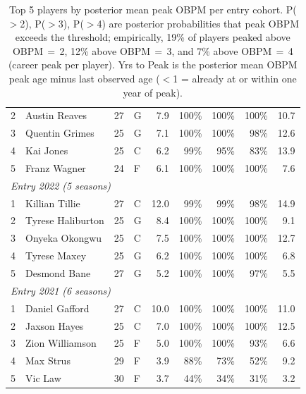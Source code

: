 \begin{table}[htbp]
\begin{tabular}{rlrlrrrrr}
    2 & Austin Reaves & 27 & G & 7.9 & 100\% & 100\% & 100\% & 10.7 \\
    3 & Quentin Grimes & 25 & G & 7.1 & 100\% & 100\% & 98\% & 12.6 \\
    4 & Kai Jones & 25 & C & 6.2 & 99\% & 95\% & 83\% & 13.9 \\
    5 & Franz Wagner & 24 & F & 6.1 & 100\% & 100\% & 100\% & 7.6 \\
    \midrule[0.4pt]
    \multicolumn{9}{l}{\textit{Entry 2022 (5 seasons)}} \\
    \midrule
    1 & Killian Tillie & 27 & C & 12.0 & 99\% & 99\% & 98\% & 14.9 \\
    2 & Tyrese Haliburton & 25 & G & 8.4 & 100\% & 100\% & 100\% & 9.1 \\
    3 & Onyeka Okongwu & 25 & C & 7.5 & 100\% & 100\% & 100\% & 12.7 \\
    4 & Tyrese Maxey & 25 & G & 6.2 & 100\% & 100\% & 100\% & 6.8 \\
    5 & Desmond Bane & 27 & G & 5.2 & 100\% & 100\% & 97\% & 5.5 \\
    \midrule[0.4pt]
    \multicolumn{9}{l}{\textit{Entry 2021 (6 seasons)}} \\
    \midrule
    1 & Daniel Gafford & 27 & C & 10.0 & 100\% & 100\% & 100\% & 11.0 \\
    2 & Jaxson Hayes & 25 & C & 7.0 & 100\% & 100\% & 100\% & 12.5 \\
    3 & Zion Williamson & 25 & F & 5.0 & 100\% & 100\% & 93\% & 6.6 \\
    4 & Max Strus & 29 & F & 3.9 & 88\% & 73\% & 52\% & 9.2 \\
    5 & Vic Law & 30 & F & 3.7 & 44\% & 34\% & 31\% & 3.2 \\
    \bottomrule
  \end{tabular}
  \caption{Top 5 players by posterior mean peak OBPM per entry cohort. P($>$2), P($>$3), P($>$4) are posterior probabilities that peak OBPM exceeds the threshold; empirically, 19\% of players peaked above OBPM\,$=$\,2, 12\% above OBPM\,$=$\,3, and 7\% above OBPM\,$=$\,4 (career peak per player). Yrs to Peak is the posterior mean OBPM peak age minus last observed age ($<$1 = already at or within one year of peak).}
  \label{tab:breakout_cohort}
\end{table}

